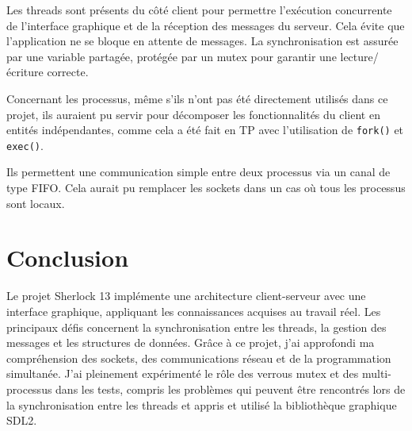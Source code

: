 \documentclass{article}
\begin{document}
Les threads sont présents du côté client pour permettre l'exécution concurrente de l'interface graphique et de la réception des messages du serveur. 
Cela évite que l'application ne se bloque en attente de messages. 
La synchronisation est assurée par une variable partagée, protégée par un mutex pour garantir une lecture/écriture correcte.

Concernant les processus, même s'ils n'ont pas été directement utilisés dans ce projet, 
ils auraient pu servir pour décomposer les fonctionnalités du client en entités indépendantes, 
comme cela a été fait en TP avec l'utilisation de \texttt{fork()} et \texttt{exec()}.

Ils permettent une communication simple entre deux processus via un canal de type FIFO. 
Cela aurait pu remplacer les sockets dans un cas où tous les processus sont locaux.

\section{Conclusion}

Le projet Sherlock 13 implémente une architecture client-serveur avec une interface graphique, appliquant les connaissances acquises au travail réel. 
Les principaux défis concernent la synchronisation entre les threads, la gestion des messages et les structures de données. 
Grâce à ce projet, j'ai approfondi ma compréhension des sockets, des communications réseau et de la programmation simultanée. 
J'ai pleinement expérimenté le rôle des verrous mutex et des multi-processus dans les tests, 
compris les problèmes qui peuvent être rencontrés lors de la synchronisation entre les threads et appris et utilisé la bibliothèque graphique SDL2.
\end{document}

